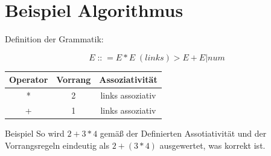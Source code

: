 \documentclass[t]{beamer}
\renewcommand{\Coloneqq}{\mathrel{\mathop{::}}=}
\begin{document}
	\section{Beispiel Algorithmus}\label{sec:beispiel-algorithmus}
	\begin{frame}
		\centering
		\begin{block}{Definition der Grammatik:}
			\vspace{1em}
			\begin{minipage}[c]{0.5\textwidth}
				\centering
				\[E \Coloneqq E * E \phantom{|} (links) > E + E | num \]
			\end{minipage}%
			\begin{minipage}[c]{0.5\textwidth}
				\begin{tabular}{|c|c|c|}
					\hline
					Operator & Vorrang & Assoziativität   \\
					\hline
					*             & 2       & links assoziativ \\
					\hline
					+             & 1       & links assoziativ \\
					\hline
				\end{tabular}\label{tab:table4}
			\end{minipage}
		\end{block}
		\bigskip
		\begin{exampleblock}{Beispiel}
			So wird $2 + 3 * 4$ gemäß der Definierten Assotiativität und der Vorrangsregeln eindeutig als
			$2 + (3 * 4)$ ausgewertet, was korrekt ist.
		\end{exampleblock}
	\end{frame}
\end{document}
